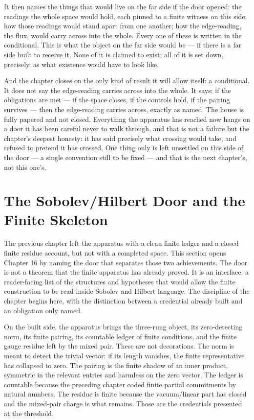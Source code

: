 It then names the things that would live on the far side if the door opened: the readings the whole space would hold, each pinned to a finite witness on this side; how those readings would stand apart from one another; how the edge-reading, the flux, would carry across into the whole. Every one of these is written in the conditional. This is what the object on the far side would be --- if there is a far side built to receive it. None of it is claimed to exist; all of it is set down, precisely, as what existence would have to look like.

And the chapter closes on the only kind of result it will allow itself: a conditional. It does not say the edge-reading carries across into the whole. It says: if the obligations are met --- if the space closes, if the controls hold, if the pairing survives --- then the edge-reading carries across, exactly as named. The house is fully papered and not closed. Everything the apparatus has reached now hangs on a door it has been careful never to walk through, and that is not a failure but the chapter's deepest honesty: it has said precisely what crossing would take, and refused to pretend it has crossed. One thing only is left unsettled on this side of the door --- a single convention still to be fixed --- and that is the next chapter's, not this one's.

\section{The Sobolev/Hilbert Door and the Finite Skeleton}

The previous chapter left the apparatus with a clean finite ledger and a
closed finite residue account, but not with a completed space. This section
opens Chapter 16 by naming the door that separates those two achievements. The
door is not a theorem that the finite apparatus has already proved. It is an
interface: a reader-facing list of the structures and hypotheses that would
allow the finite construction to be read inside Sobolev and Hilbert language.
The discipline of the chapter begins here, with the distinction between a
credential already built and an obligation only named.

On the built side, the apparatus brings the three-rung object, its
zero-detecting norm, its finite pairing, its countable ledger of finite
conditions, and the finite gauge residue left by the mixed pair. These are not
decorations. The norm is meant to detect the trivial vector: if its length
vanishes, the finite representative has collapsed to zero. The pairing is the
finite shadow of an inner product, symmetric in the relevant entries and
harmless on the zero vector. The ledger is countable because the preceding
chapter coded finite partial commitments by natural numbers. The residue is
finite because the vacuum/linear part has closed and the mixed-pair charge is
what remains. Those are the credentials presented at the threshold.

